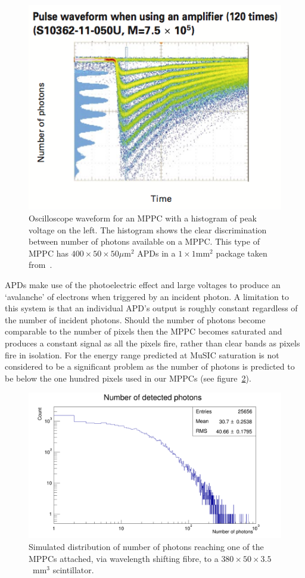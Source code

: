 \begin{figure}[hptb]
  \centering
    \includegraphics[width=.6\textwidth]{images/intro/hamamatsu_mppc_waveform_and_counts.png}
  \caption{Oscilloscope waveform for an MPPC with a histogram of peak voltage on the left. The histogram shows the clear discrimination between number of photons available on a MPPC. This type of MPPC has \(400\times50\times50 \mu\text{m}^2\) APDs in a \(1\times1\text{mm}^2\) package taken from~\cite{hamamatsu_mppc_tech_report}.}
  \label{fig:images_intro_hamamatsu_mppc_waveform_and_counts}
\end{figure}

APDs make use of the photoelectric effect and large voltages to produce an `avalanche' of electrons when triggered by an incident photon. A limitation to this system is that an individual APD's output is roughly constant regardless of the number of incident photons. Should the number of photons become comparable to the number of pixels then the MPPC becomes saturated and produces a constant signal as all the pixels fire, rather than clear bands as pixels fire in isolation. For the energy range predicted at MuSIC saturation is not considered to be a significant problem as the number of photons is predicted to be below the one hundred pixels used in our MPPCs (see figure~\ref{fig:sim_n_photons}). 

\begin{figure}[hptb] 
  \centering    \includegraphics[width=.9\textwidth]{images/plot_generating_scripts/n_photons.png}
  \caption{Simulated distribution of number of photons reaching one of the MPPCs attached, via wavelength shifting fibre, to a \(380\times50\times3.5\)~mm\(^3\) scintillator.}
  \label{fig:sim_n_photons}
\end{figure}


